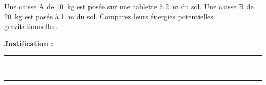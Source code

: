 Une caisse A de \qty{10}{kg} est posée sur une tablette à \qty{2}{m} du sol. Une caisse B de \qty{20}{kg} est posée à \qty{1}{m} du sol. Comparez leurs énergies potentielles gravitationnelles.

\choices

\noindent\textbf{Justification :} \hrulefill \\[2.5ex]
\rule{\linewidth}{0.4pt} \\[2.5ex]
\rule{\linewidth}{0.4pt}
\vfill
